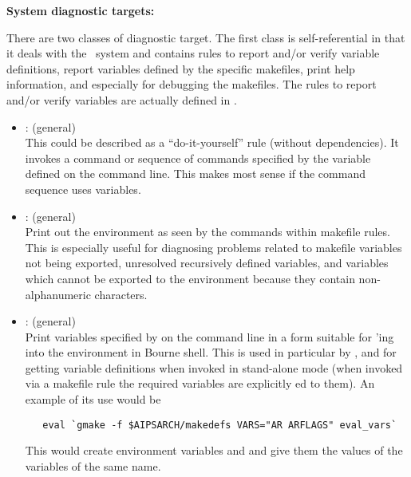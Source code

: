 \noindent
\textbf{System diagnostic targets:}

\noindent
There are two classes of diagnostic target.  The first class is
self-referential in that it deals with the \aipspp\ system and contains rules
to report and/or verify  variable definitions, report
variables defined by the specific makefiles, print help information, and
especially for debugging the makefiles.  The rules to report and/or verify
 variables are actually defined in .

\begin{itemize}
\item
    : (general)
   \\ This could be described as a ``do-it-yourself'' rule (without
   dependencies).  It invokes a command or sequence of commands specified by
   the  variable defined on the  command line.
   This makes most sense if the command sequence uses 
   variables.

\item
    : (general)
   \\ Print out the environment as seen by the commands within makefile rules.
   This is especially useful for diagnosing problems related to makefile
   variables not being exported, unresolved recursively defined variables, and
   variables which cannot be exported to the environment because they contain
   non-alphanumeric characters.

\item
    : (general)
   \\ Print variables specified by  on the  command
   line in a form suitable for 'ing into the environment in
   Bourne shell.  This is used in particular by ,
    and  for getting 
   variable definitions when invoked in stand-alone mode (when invoked via a
   makefile rule the required variables are explicitly ed to
   them).  An example of its use would be

\begin{verbatim}
   eval `gmake -f $AIPSARCH/makedefs VARS="AR ARFLAGS" eval_vars`
\end{verbatim}

   \noindent
   This would create environment variables  and  and
   give them the values of the  variables of the same name.


\end{itemize}
